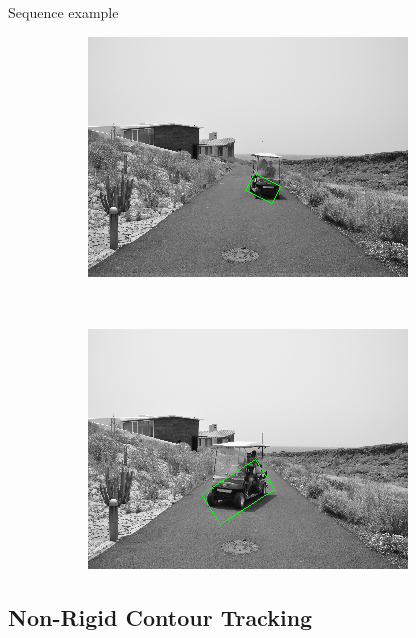 \begin{frame}{Sequence example}
\begin{figure}[h!]
\begin{subfigure}[b]{0.24\columnwidth}
	  \includegraphics[width=\textwidth]{sequence/seq7}\label{fig:seq7}
      \end{subfigure}%
      ~
      \begin{subfigure}[b]{0.24\columnwidth}
	  \includegraphics[width=\textwidth]{sequence/seq8}\label{fig:seq8}
      \end{subfigure}%
  \end{figure}
\end{frame}

\subsection{Non-Rigid Contour Tracking}

